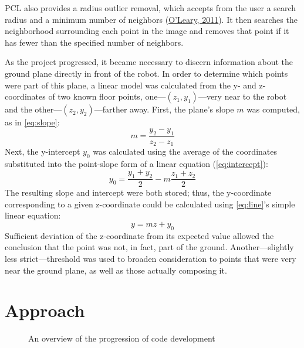 \documentclass[12pt]{report}
\begin{document}
PCL also provides a radius outlier removal, which accepts from the user a search radius and a minimum number of neighbors (\hyperref[bib:oleary]{O'Leary, 2011}).  It then searches the neighborhood surrounding each point in the image and removes that point if it has fewer than the specified number of neighbors.

As the project progressed, it became necessary to discern information about the ground plane directly in front of the robot.  In order to determine which points were part of this plane, a linear model was calculated from the y- and z-coordinates of two known floor points, one---$(z_1,y_1)$---very near to the robot and the other---$(z_2,y_2)$---farther away.  First, the plane's slope $m$ was computed, as in \autoref{eq:slope}:
\begin{equation}
\label{eq:slope}
m=\frac{y_2-y_1}{z_2-z_1}
\end{equation}
Next, the y-intercept $y_0$ was calculated using the average of the coordinates substituted into the point-slope form of a linear equation (\autoref{eq:intercept}):
\begin{equation}
\label{eq:intercept}
y_0=\frac{y_1+y_2}{2}-m\frac{z_1+z_2}{2}
\end{equation}
The resulting slope and intercept were both stored; thus, the y-coordinate corresponding to a given z-coordinate could be calculated using \autoref{eq:line}'s simple linear equation:
\begin{equation}
\label{eq:line}
y=mz+y_0
\end{equation}
Sufficient deviation of the z-coordinate from its expected value allowed the conclusion that the point was not, in fact, part of the ground.  Another---slightly less strict---threshold was used to broaden consideration to points that were very near the ground plane, as well as those actually composing it.

\section{Approach}
\label{sec:approach}
\begin{figure}[h]
\caption[Development cycle overview]{An overview of the progression of code development}
\label{fig:progressionbrief}
\end{figure}
\end{document}
